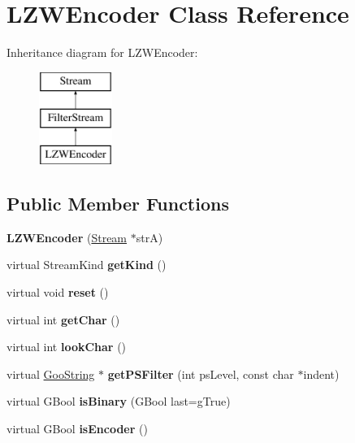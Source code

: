 \hypertarget{class_l_z_w_encoder}{}\section{L\+Z\+W\+Encoder Class Reference}
\label{class_l_z_w_encoder}
Inheritance diagram for L\+Z\+W\+Encoder\+:\begin{figure}[H]
\begin{center}
\leavevmode
\includegraphics[height=3.000000cm]{class_l_z_w_encoder}
\end{center}
\end{figure}
\subsection*{Public Member Functions}
\begin{DoxyCompactItemize}
\item 
\mbox{\label{class_l_z_w_encoder_ad98728ec2fa70c29699bcadab5bc8acb}} 
{\bfseries L\+Z\+W\+Encoder} (\hyperlink{class_stream}{Stream} $\ast$strA)
\item 
\mbox{\label{class_l_z_w_encoder_a748e22bd172b5f8b91f232f609f8a134}} 
virtual Stream\+Kind {\bfseries get\+Kind} ()
\item 
\mbox{\label{class_l_z_w_encoder_a2577eabfeabe3345c60ddd12acab9ebd}} 
virtual void {\bfseries reset} ()
\item 
\mbox{\label{class_l_z_w_encoder_a6a3af7d41108dd2424a4ea3022e7499a}} 
virtual int {\bfseries get\+Char} ()
\item 
\mbox{\label{class_l_z_w_encoder_a212ce40c253b6953b8834bee162bf7ed}} 
virtual int {\bfseries look\+Char} ()
\item 
\mbox{\label{class_l_z_w_encoder_a4824154b42a56092c771ef7ec2b372db}} 
virtual \hyperlink{class_goo_string}{Goo\+String} $\ast$ {\bfseries get\+P\+S\+Filter} (int ps\+Level, const char $\ast$indent)
\item 
\mbox{\label{class_l_z_w_encoder_ad8dbe5128af9e74b00990020a90c68ca}} 
virtual G\+Bool {\bfseries is\+Binary} (G\+Bool last=g\+True)
\item 
\mbox{\label{class_l_z_w_encoder_acace1b3ac380efe5003f2f4f95cdf9bf}} 
virtual G\+Bool {\bfseries is\+Encoder} ()
\end{DoxyCompactItemize}
